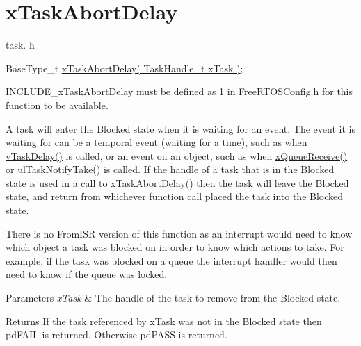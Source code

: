\hypertarget{group__x_task_abort_delay}{}\section{x\+Task\+Abort\+Delay}
\label{group__x_task_abort_delay}
task. h 
\begin{DoxyPre}
BaseType\_t \hyperlink{externals_2freertos_2include_2task_8h_afefe333df0492c8411c0094badd25185}{xTaskAbortDelay( TaskHandle\_t xTask )};
\end{DoxyPre}


I\+N\+C\+L\+U\+D\+E\+\_\+x\+Task\+Abort\+Delay must be defined as 1 in Free\+R\+T\+O\+S\+Config.\+h for this function to be available.

A task will enter the Blocked state when it is waiting for an event. The event it is waiting for can be a temporal event (waiting for a time), such as when \hyperlink{externals_2freertos_2include_2task_8h_aa154068cecd7f31446a7a84af44ab1a3}{v\+Task\+Delay()} is called, or an event on an object, such as when \hyperlink{vendor_2ceedling_2plugins_2freertos_2src_2freertos_2include_2queue_8h_af1549eac0e7f05694a59a0b967c80be3}{x\+Queue\+Receive()} or \hyperlink{externals_2freertos_2include_2task_8h_a725a2da114ef870747edd7fd19d77bab}{ul\+Task\+Notify\+Take()} is called. If the handle of a task that is in the Blocked state is used in a call to \hyperlink{externals_2freertos_2include_2task_8h_afefe333df0492c8411c0094badd25185}{x\+Task\+Abort\+Delay()} then the task will leave the Blocked state, and return from whichever function call placed the task into the Blocked state.

There is no \textquotesingle{}From\+I\+SR\textquotesingle{} version of this function as an interrupt would need to know which object a task was blocked on in order to know which actions to take. For example, if the task was blocked on a queue the interrupt handler would then need to know if the queue was locked.


\begin{DoxyParams}{Parameters}
{\em x\+Task} & The handle of the task to remove from the Blocked state.\\
\hline
\end{DoxyParams}
\begin{DoxyReturn}{Returns}
If the task referenced by x\+Task was not in the Blocked state then pd\+F\+A\+IL is returned. Otherwise pd\+P\+A\+SS is returned. 
\end{DoxyReturn}
